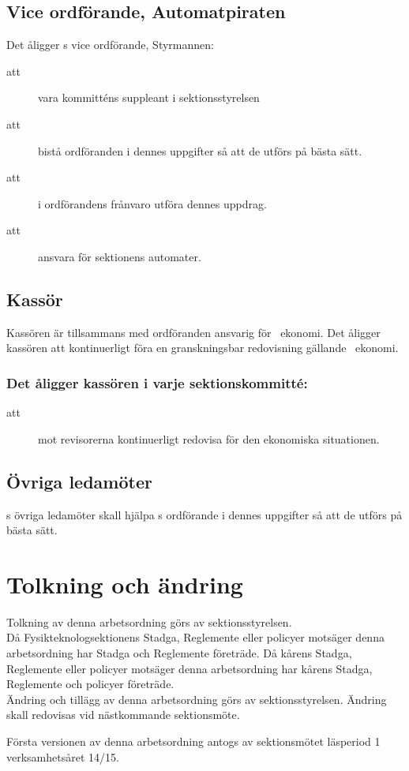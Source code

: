 \subsection{Vice ordförande, Automatpiraten}
Det åligger \forening s vice ordförande, Styrmannen:
\begin{description}
\item[att] vara kommitténs suppleant i sektionsstyrelsen
\item[att] bistå ordföranden i dennes uppgifter så att de utförs på bästa sätt.
\item[att] i ordförandens frånvaro utföra dennes uppdrag.
\item[att] ansvara för sektionens automater.
\end{description}


\subsection{Kassör}
Kassören är tillsammans med ordföranden ansvarig för \forening \ ekonomi. Det åligger kassören att kontinuerligt föra en granskningsbar redovisning gällande \forening \ ekonomi.\\

\subsubsection{Det åligger kassören i varje sektionskommitté:}
\begin{description}
\item[att] mot revisorerna kontinuerligt redovisa för den ekonomiska situationen.
\end{description}


\subsection{Övriga ledamöter}
\forening s övriga ledamöter skall hjälpa \forening s ordförande i dennes uppgifter så att de utförs på bästa sätt.

\section{Tolkning och ändring}
Tolkning av denna arbetsordning görs av sektionsstyrelsen.\\ Då Fysikteknologsektionens Stadga, Reglemente eller policyer motsäger denna arbetsordning har Stadga och Reglemente företräde. Då kårens Stadga, Reglemente eller policyer motsäger denna arbetsordning har kårens Stadga, Reglemente och policyer företräde.\\
Ändring och tillägg av denna arbetsordning görs av sektionsstyrelsen. Ändring skall redovisas vid nästkommande sektionsmöte. 

Första versionen av denna arbetsordning antogs av sektionsmötet läsperiod 1 verksamhetsåret 14/15.

\newpage
